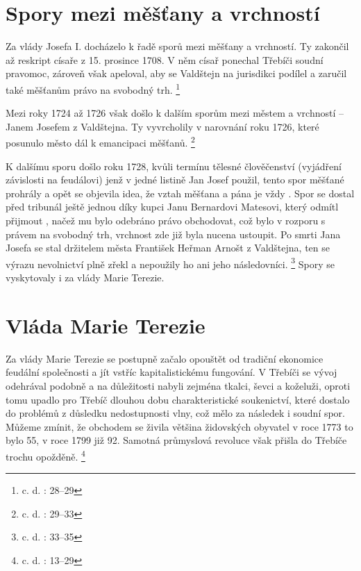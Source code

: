 \documentclass[a4paper,oneside,12p]{report}
\begin{document}
\section{Spory mezi měšťany a vrchností}

Za vlády Josefa I. docházelo k řadě sporů mezi měšťany a vrchností.
Ty zakončil až reskript císaře z 15. prosince 1708.
V něm císař ponechal Třebíči soudní pravomoc, zároveň však apeloval, aby se Valdštejn na jurisdikci podílel a zaručil také měšťanům právo na svobodný trh. \footnote{c. d. : 28--29}

Mezi roky 1724 až 1726 však došlo k dalším sporům mezi městem a vrchností -- Janem Josefem z Valdštejna.
Ty vyvrcholily v narovnání roku 1726, které posunulo město dál k emancipaci měšťanů. \footnote{c. d. : 29--33}

K dalšímu sporu došlo roku 1728, kvůli termínu tělesné člověčenství (vyjádření závislosti na feudálovi) jenž v jedné listině Jan Josef použil, tento spor měšťané prohrály a opět se objevila idea, že vztah měšťana a pána je vždy .
Spor se dostal před tribunál ještě jednou díky kupci Janu Bernardovi Matesovi, který odmítl přijmout , načež mu bylo odebráno právo obchodovat, což bylo v rozporu s právem na svobodný trh, vrchnost zde již byla nucena ustoupit.
Po smrti Jana Josefa se stal držitelem města František Heřman Arnošt z Valdštejna, ten se výrazu nevolnictví plně zřekl a nepoužily ho ani jeho následovníci. \footnote{c. d. : 33--35}
Spory se vyskytovaly i za vlády Marie Terezie.

\section{Vláda Marie Terezie}

Za vlády Marie Terezie se postupně začalo opouštět od tradiční ekonomice feudální společnosti a jít vstříc kapitalistickému fungování.
V Třebíči se vývoj odehrával podobně a na důležitosti nabyli zejména tkalci, ševci a koželuži, oproti tomu upadlo pro Třebíč dlouhou dobu charakteristické soukenictví, které dostalo do problémů z důsledku nedostupnosti vlny, což mělo za následek i soudní spor.
Můžeme zmínit, že obchodem se živila většina židovských obyvatel v roce 1773 to bylo 55, v roce 1799 již 92.
Samotná průmyslová revoluce však přišla do Třebíče trochu opožděně. \footnote{c. d. : 13--29}
\end{document}
